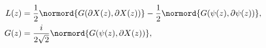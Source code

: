 \begin{equation}
\label{eq:LG}
\begin{split}
  L(z) &= \frac{1}{2} \normord{G(\partial X(z), \partial X(z))} -
  \frac{1}{2} \normord{G(\psi(z), \partial \psi(z))}, \\
  G(z) &= \frac{i}{2\sqrt{2}} \normord{G(\psi(z), \partial X(z))},
\end{split}
\end{equation}

